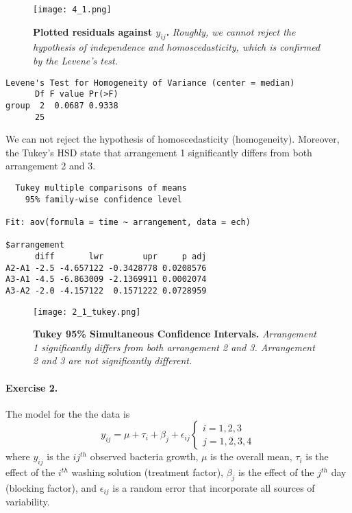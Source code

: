 \documentclass{article}
\begin{document}
\begin{figure}[H]
	  \centering
  	\texttt{[image: 4\_1.png]}
  	\caption{\textbf{Plotted residuals against $\widehat{y}_{ij}$.} \textsl{Roughly, we cannot reject the hypothesis of independence and homoscedasticity, which is confirmed by the Levene's test.}
  	}
	\end{figure}
	\begin{verbatim}
Levene's Test for Homogeneity of Variance (center = median)
      Df F value Pr(>F)
group  2  0.0687 0.9338
      25  
\end{verbatim}
We can not reject the hypothesis of homoscedasticity (homogeneity). Moreover, the Tukey's HSD state that arrangement 1 significantly differs from both arrangement 2 and 3.
\begin{verbatim}
  Tukey multiple comparisons of means
    95% family-wise confidence level

Fit: aov(formula = time ~ arrangement, data = ech)

$arrangement
      diff       lwr        upr     p adj
A2-A1 -2.5 -4.657122 -0.3428778 0.0208576
A3-A1 -4.5 -6.863009 -2.1369911 0.0002074
A3-A2 -2.0 -4.157122  0.1571222 0.0728959
\end{verbatim}
\begin{figure}[H]
	  \centering
  	\texttt{[image: 2\_1\_tukey.png]}
  	\caption{\textbf{Tukey 95\% Simultaneous Confidence Intervals.} \textsl{Arrangement 1 significantly differs  from both arrangement 2 and 3. Arrangement 2 and 3 are not significantly different.}
  	}
	\end{figure}

\paragraph{Exercise 2.}
The model for the the data is $$
y_{ij}=\mu +\tau_i+\beta_j +\epsilon_{ij} \left \{
    \begin{array}{ll}
        i=1,2,3 \\
		j=1,2,3,4
    \end{array}
\right.
$$
where $y_{ij}$ is the $ij^{th}$ observed bacteria growth, $\mu$ is the overall mean, $\tau_i$ is the effect of the $i^{th}$ washing solution (treatment factor), $\beta_j$ is the effect of the $j^{th}$ day (blocking factor), and $\epsilon_{ij}$ is a random error that incorporate all sources of variability.\\
\end{document}
